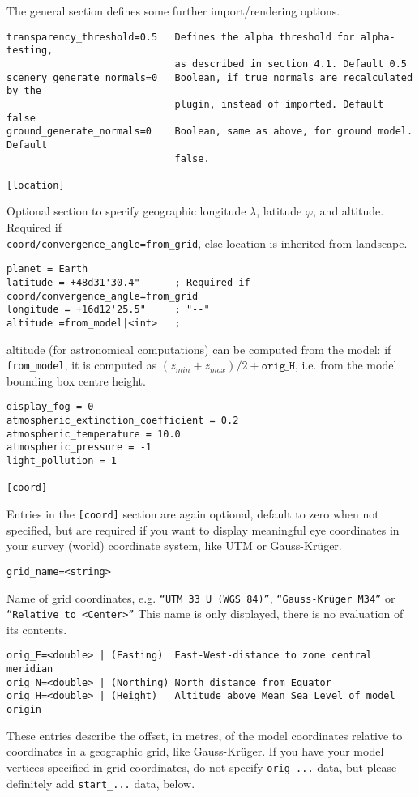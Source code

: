 \documentclass[a4paper]{article}
\begin{document}
The general section defines some further import/rendering options.
%
\begin{verbatim}
transparency_threshold=0.5   Defines the alpha threshold for alpha-testing, 
                             as described in section 4.1. Default 0.5
scenery_generate_normals=0   Boolean, if true normals are recalculated by the
                             plugin, instead of imported. Default false
ground_generate_normals=0    Boolean, same as above, for ground model. Default
                             false.

[location]
\end{verbatim}
Optional section to specify geographic longitude $\lambda$, latitude $\varphi$,
and altitude. Required if\\ \verb|coord/convergence_angle=from_grid|, else
location is inherited from landscape.
\begin{verbatim}
planet = Earth
latitude = +48d31'30.4"      ; Required if coord/convergence_angle=from_grid
longitude = +16d12'25.5"     ; "--"
altitude =from_model|<int>   ; 
\end{verbatim}
altitude (for astronomical computations) can be computed from the model:  if
\verb|from_model|, it is computed as $(z_{min}+z_{max})/2+\mathtt{orig\_H}$,
i.e. from the model bounding box centre height.

\begin{verbatim}
display_fog = 0
atmospheric_extinction_coefficient = 0.2
atmospheric_temperature = 10.0
atmospheric_pressure = -1
light_pollution = 1

[coord]
\end{verbatim}

Entries in the \verb|[coord]| section are again optional, default to zero when
not specified, but are
required if you want to display meaningful eye coordinates in your
survey (world) coordinate system, like UTM or Gauss-Kr\"uger.  

\begin{verbatim}
grid_name=<string> 
\end{verbatim}
Name of grid coordinates, e.g. \texttt{``UTM 33 U (WGS 84)''},
\texttt{``Gauss-Kr\"uger M34''} or \texttt{``Relative to <Center>''} This name is
only displayed, there is no evaluation of its contents.

\begin{verbatim}
orig_E=<double> | (Easting)  East-West-distance to zone central meridian
orig_N=<double> | (Northing) North distance from Equator
orig_H=<double> | (Height)   Altitude above Mean Sea Level of model origin
\end{verbatim}
These entries describe the offset, in metres, of the model coordinates relative
to coordinates in a geographic grid, like Gauss-Kr\"uger. If you have your model
vertices specified in grid coordinates, do not specify \verb|orig_...| data, but
please definitely add \verb|start_...| data, below.
\end{document}
